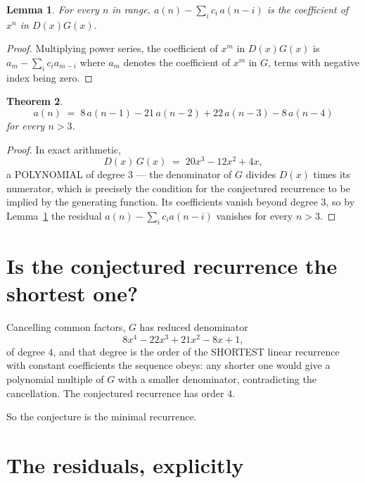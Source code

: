 \documentclass[11pt,a4paper]{article}
\theoremstyle{plain}
\newtheorem{theorem}{Theorem}
\newtheorem{lemma}[theorem]{Lemma}
\theoremstyle{definition}
\begin{document}
\begin{lemma}\label{lem:key}
For every $n$ in range, $a(n)-\sum_i c_i\,a(n-i)$ is the coefficient of $x^{n}$ in
$D(x)G(x)$.
\end{lemma}

\begin{proof}
Multiplying power series, the coefficient of $x^{m}$ in $D(x)G(x)$ is
$a_m-\sum_i c_i a_{m-i}$ where $a_m$ denotes the coefficient of $x^{m}$ in $G$, terms with
negative index being zero.
\end{proof}

\begin{theorem}
\[
a(n)\;=\;8\,a(n-1) - 21\,a(n-2) + 22\,a(n-3) - 8\,a(n-4)
\]
for every $n>3$.
\end{theorem}

\begin{proof}
In exact arithmetic,
\[
D(x)\,G(x)\;=\;20 x^{3} - 12 x^{2} + 4 x,
\]
a POLYNOMIAL of degree $3$ --- the denominator of $G$ divides $D(x)$ times its numerator,
which is precisely the condition for the conjectured recurrence to be implied by the
generating function. Its coefficients vanish beyond degree $3$, so by
Lemma~\ref{lem:key} the residual $a(n)-\sum_ic_ia(n-i)$ vanishes for every
$n>3$.
\end{proof}

\section{Is the conjectured recurrence the shortest one?}

Cancelling common factors, $G$ has reduced denominator
\[
8 x^{4} - 22 x^{3} + 21 x^{2} - 8 x + 1,
\]
of degree $4$, and that degree is the order of the SHORTEST linear recurrence with
constant coefficients the sequence obeys: any shorter one would give a polynomial multiple of
$G$ with a smaller denominator, contradicting the cancellation. The conjectured recurrence has
order $4$.

So the conjecture is the minimal recurrence.

\section{The residuals, explicitly}
\end{document}
